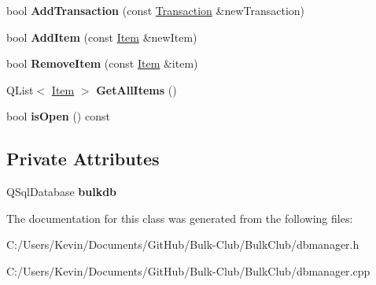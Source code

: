 \begin{DoxyCompactItemize}
bool {\bfseries Add\+Transaction} (const \mbox{\hyperlink{class_transaction}{Transaction}} \&new\+Transaction)
\item 
\mbox{\label{class_d_b_manager_ada82cd13fd36808cb0a47aa3fd1f85e2}} 
bool {\bfseries Add\+Item} (const \mbox{\hyperlink{class_item}{Item}} \&new\+Item)
\item 
\mbox{\label{class_d_b_manager_ae8eb0099d4749c691d243ac5ca806c30}} 
bool {\bfseries Remove\+Item} (const \mbox{\hyperlink{class_item}{Item}} \&item)
\item 
\mbox{\label{class_d_b_manager_a9a493b6c8e195842cc287cc3338bcd16}} 
Q\+List$<$ \mbox{\hyperlink{class_item}{Item}} $>$ {\bfseries Get\+All\+Items} ()
\item 
\mbox{\label{class_d_b_manager_a987f90b871cb3ae67cb89ea1cc324995}} 
bool {\bfseries is\+Open} () const
\end{DoxyCompactItemize}
\subsection*{Private Attributes}
\begin{DoxyCompactItemize}
\item 
\mbox{\label{class_d_b_manager_a98bdcc2ff763cf208e71d24b6d7c8f96}} 
Q\+Sql\+Database {\bfseries bulkdb}
\end{DoxyCompactItemize}


The documentation for this class was generated from the following files\+:\begin{DoxyCompactItemize}
\item 
C\+:/\+Users/\+Kevin/\+Documents/\+Git\+Hub/\+Bulk-\/\+Club/\+Bulk\+Club/dbmanager.\+h\item 
C\+:/\+Users/\+Kevin/\+Documents/\+Git\+Hub/\+Bulk-\/\+Club/\+Bulk\+Club/dbmanager.\+cpp\end{DoxyCompactItemize}
